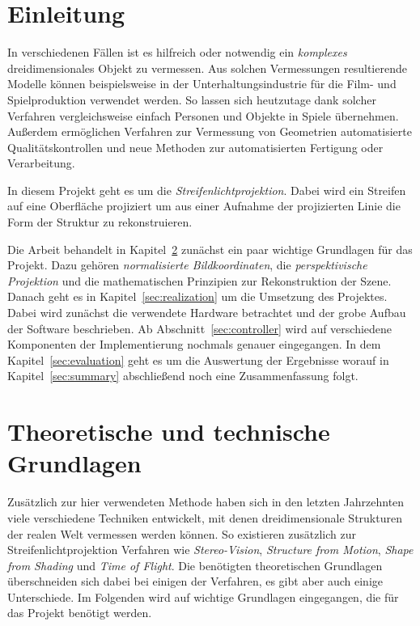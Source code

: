 \documentclass[ngerman,a4paper,parskip=half]{scrartcl}
\begin{document}


\tableofcontents
\newpage


\section{Einleitung}
\label{sec:introduction}

In verschiedenen Fällen ist es hilfreich oder notwendig ein \emph{komplexes} dreidimensionales Objekt zu vermessen. Aus solchen Vermessungen resultierende Modelle können beispielsweise in der Unterhaltungsindustrie für die Film- und Spielproduktion verwendet werden. So lassen sich heutzutage dank solcher Verfahren vergleichsweise einfach Personen und Objekte in Spiele übernehmen. Außerdem ermöglichen Verfahren zur Vermessung von Geometrien automatisierte Qualitätskontrollen und neue Methoden zur automatisierten Fertigung oder Verarbeitung.

In diesem Projekt geht es um die \emph{Streifenlichtprojektion}. Dabei wird ein Streifen auf eine Oberfläche projiziert um aus einer Aufnahme der projizierten Linie die Form der Struktur zu rekonstruieren.

Die Arbeit behandelt in Kapitel~\ref{sec:basics} zunächst ein paar wichtige Grundlagen für das Projekt. Dazu gehören \emph{normalisierte Bildkoordinaten}, die \emph{perspektivische Projektion} und die mathematischen Prinzipien zur Rekonstruktion der Szene. Danach geht es in Kapitel~\ref{sec:realization} um die Umsetzung des Projektes. Dabei wird zunächst die verwendete Hardware betrachtet und der grobe Aufbau der Software beschrieben. Ab Abschnitt~\ref{sec:controller} wird auf verschiedene Komponenten der Implementierung nochmals genauer eingegangen. In dem Kapitel~\ref{sec:evaluation} geht es um die Auswertung der Ergebnisse worauf in Kapitel~\ref{sec:summary} abschließend noch eine Zusammenfassung folgt.


\section{Theoretische und technische Grundlagen}
\label{sec:basics}

Zusätzlich zur hier verwendeten Methode haben sich in den letzten Jahrzehnten viele verschiedene Techniken entwickelt, mit denen dreidimensionale Strukturen der realen Welt vermessen werden können. So existieren zusätzlich zur Streifenlichtprojektion Verfahren wie \emph{Stereo-Vision}, \emph{Structure from Motion}, \emph{Shape from Shading} und \emph{Time of Flight}. Die benötigten theoretischen Grundlagen überschneiden sich dabei bei einigen der Verfahren, es gibt aber auch einige Unterschiede. Im Folgenden wird auf wichtige Grundlagen eingegangen, die für das Projekt benötigt werden.
\end{document}
